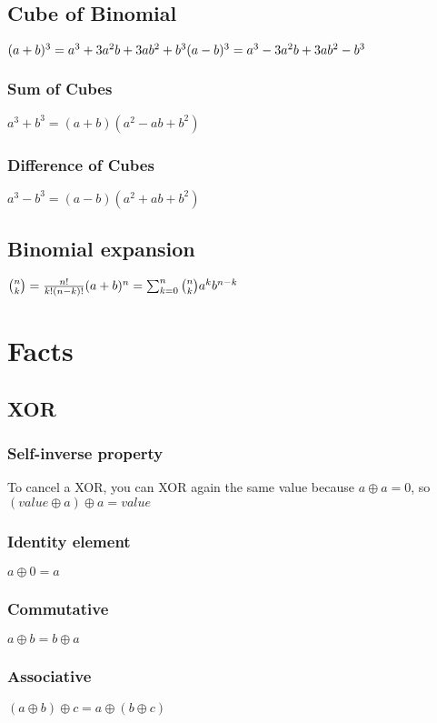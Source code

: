\documentclass{article}
\begin{document}
\subsection{Cube of Binomial}
$(a+b)^3 = a^3 + 3a^2b + 3ab^2 + b^3
\newline
(a-b)^3 = a^3 - 3a^2b + 3ab^2-b^3
$

\subsubsection{Sum of Cubes}
$a^3 + b^3 = (a+b)(a^2 - ab + b^2)$

\subsubsection{Difference of Cubes}
$a^3-b^3 = (a-b)(a^2 +ab + b^2)$

\subsection{Binomial expansion}
$\binom{n}{k} = \frac{n!}{k!(n-k)!}
\newline
(a+b)^n = \sum_{k=0}^{n} \binom{n}{k}a^{k}b^{n-k}$

\section{Facts}
\subsection{XOR}
\subsubsection{Self-inverse property}
To cancel a XOR, you can XOR again the same value because $a \oplus a = 0$, so $(value \oplus a) \oplus a = value$

\subsubsection{Identity element}
$a \oplus 0 = a$

\subsubsection{Commutative}
$a \oplus b = b \oplus a$

\subsubsection{Associative}
$(a \oplus b) \oplus c = a \oplus (b \oplus c)$
\end{document}
